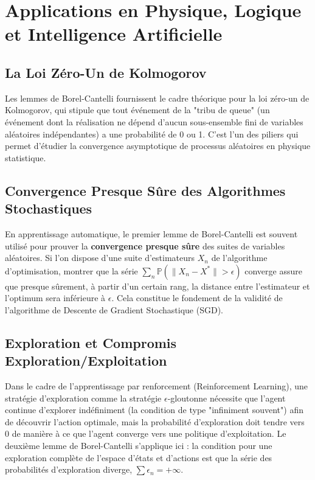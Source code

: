 \documentclass[11pt,a4paper]{article}
\begin{document}
\section{Applications en Physique, Logique et Intelligence Artificielle}

\subsection{La Loi Zéro-Un de Kolmogorov}
Les lemmes de Borel-Cantelli fournissent le cadre théorique pour la loi zéro-un de Kolmogorov, qui stipule que tout événement de la "tribu de queue" (un événement dont la réalisation ne dépend d'aucun sous-ensemble fini de variables aléatoires indépendantes) a une probabilité de 0 ou 1. C'est l'un des piliers qui permet d'étudier la convergence asymptotique de processus aléatoires en physique statistique.

\subsection{Convergence Presque Sûre des Algorithmes Stochastiques}
En apprentissage automatique, le premier lemme de Borel-Cantelli est souvent utilisé pour prouver la \textbf{convergence presque sûre} des suites de variables aléatoires. Si l'on dispose d'une suite d'estimateurs $X_n$ de l'algorithme d'optimisation, montrer que la série $\sum_{n} \mathbb{P}(\|X_n - X^*\| > \epsilon)$ converge assure que presque sûrement, à partir d'un certain rang, la distance entre l'estimateur et l'optimum sera inférieure à $\epsilon$. Cela constitue le fondement de la validité de l'algorithme de Descente de Gradient Stochastique (SGD).

\subsection{Exploration et Compromis Exploration/Exploitation}
Dans le cadre de l'apprentissage par renforcement (Reinforcement Learning), une stratégie d'exploration comme la stratégie $\epsilon$-gloutonne nécessite que l'agent continue d'explorer indéfiniment (la condition de type "infiniment souvent") afin de découvrir l'action optimale, mais la probabilité d'exploration doit tendre vers $0$ de manière à ce que l'agent converge vers une politique d'exploitation. Le deuxième lemme de Borel-Cantelli s'applique ici : la condition pour une exploration complète de l'espace d'états et d'actions est que la série des probabilités d'exploration diverge, $\sum \epsilon_n = +\infty$.
\end{document}
